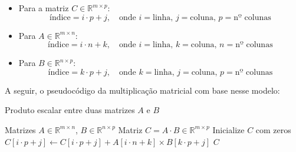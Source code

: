 \documentclass[11pt,a4paper]{article}
\begin{document}
\begin{itemize}
	\item Para a matriz \( C \in \mathbb{R}^{m \times p} \):
	      \[
		      \text{índice} = i \cdot p + j, \quad \text{onde } i = \text{linha}, \, j = \text{coluna}, \, p = \text{nº colunas}
	      \]
	\item Para \( A \in \mathbb{R}^{m \times n} \):
	      \[
		      \text{índice} = i \cdot n + k, \quad \text{onde } i = \text{linha}, \, k = \text{coluna}, \, n = \text{nº colunas}
	      \]
	\item Para \( B \in \mathbb{R}^{n \times p} \):
	      \[
		      \text{índice} = k \cdot p + j, \quad \text{onde } k = \text{linha}, \, j = \text{coluna}, \, p = \text{nº colunas}
	      \]
\end{itemize}

A seguir, o pseudocódigo da multiplicação matricial com base nesse modelo:

\begin{algorithm}[H]
	\caption{Produto escalar entre duas matrizes \( A \) e \( B \)}
	\begin{algorithmic}[1]
		\REQUIRE Matrizes \( A \in \mathbb{R}^{m \times n} \), \( B \in \mathbb{R}^{n \times p} \)
		\ENSURE Matriz \( C = A \cdot B \in \mathbb{R}^{m \times p} \)
		\STATE Inicialize \( C \) com zeros
		\STATE \( C[i \cdot p + j] \gets C[i \cdot p + j] + A[i \cdot n + k] \times B[k \cdot p + j] \)
		\ENDFOR
		\ENDFOR
		\ENDFOR
		\RETURN \( C \)
	\end{algorithmic}
\end{algorithm}

\printbibliography
\end{document}
